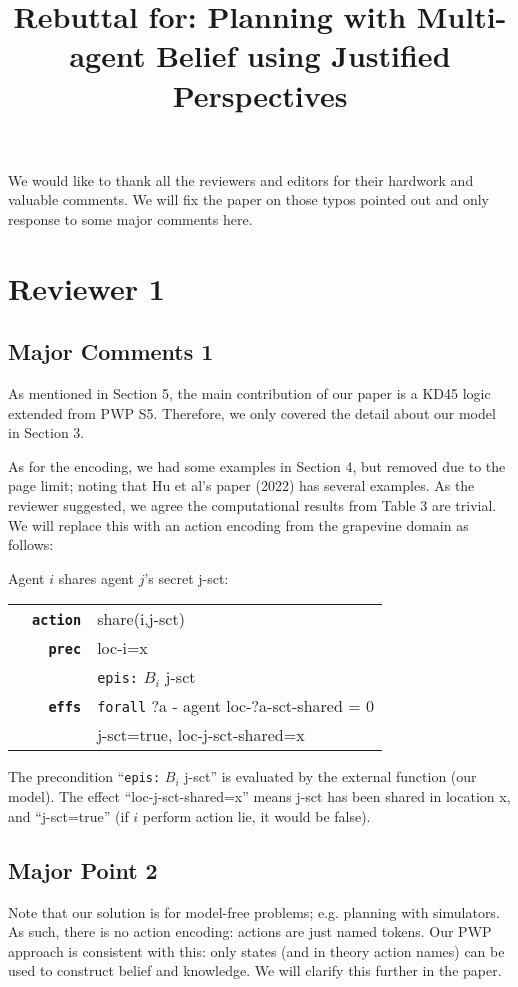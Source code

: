 \documentclass[letterpaper]{article} %
\title{Rebuttal for: Planning with Multi-agent Belief using Justified Perspectives}
\begin{document}
\maketitle
We would like to thank all the reviewers and editors for their hardwork and valuable comments.
We will fix the paper on those typos pointed out and only response to some major comments here.

\section{Reviewer 1}
\subsection{Major Comments 1}
As mentioned in Section 5, the main contribution of our paper is a KD45 logic extended from PWP S5.
Therefore, we only covered the detail about our model in Section 3.

As for the encoding, we had some examples in Section 4, but removed due to the page limit; noting that Hu et al's paper (2022) has several examples.
As the reviewer suggested, we agree the computational results from Table 3 are trivial. We will replace this with an action encoding from the grapevine domain  as follows:
\begin{example}
Agent $i$ shares agent $j$'s secret j-sct:

\begin{tabular}{rl}
~~\texttt{\textbf{action}} & share(i,j-sct)\\
~~~~\texttt{\textbf{prec}} & loc-i=x\\
 & \texttt{epis:} $B_i$ j-sct\\
~~~~\texttt{\textbf{effs}} & \texttt{forall} ?a - agent loc-?a-sct-shared = 0 \\
 & j-sct=true, loc-j-sct-shared=x\\
\end{tabular}

The precondition ``\texttt{epis:} $B_i$ j-sct'' is evaluated by the external function (our model).
The effect ``loc-j-sct-shared=x'' means j-sct has been shared in location x, and ``j-sct=true'' (if $i$ perform action lie, it would be false).

\end{example}

\subsection{Major Point 2}
Note that our solution is for model-free problems; e.g. planning with simulators. As such, there is no action encoding: actions are just named tokens. Our PWP approach is consistent with this: only states (and in theory action names) can be used to construct belief and knowledge. We will clarify this further in the paper.
\end{document}
